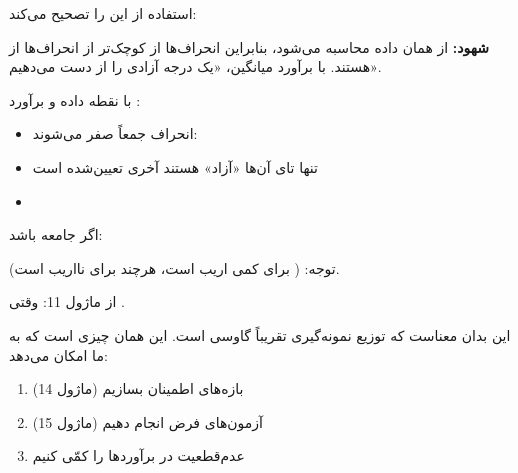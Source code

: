 استفاده از  این را تصحیح می‌کند:

\textbf{شهود:}  از همان داده محاسبه می‌شود، بنابراین انحراف‌ها از  کوچک‌تر از انحراف‌ها از \lr{$\mu$} هستند. با برآورد میانگین، «یک درجه آزادی را از دست می‌دهیم».


با  نقطه داده و برآورد :

\begin{itemize}
\tightlist
\item
   انحراف  جمعاً صفر می‌شوند: 
\item
  تنها  تای آن‌ها «آزاد» هستند  آخری تعیین‌شده است
\item
\end{itemize}


اگر جامعه  باشد:



توجه:  ( برای \lr{$\sigma$} کمی اریب است، هرچند  برای  نااریب است).


از ماژول 11:  وقتی .

این بدان معناست که توزیع نمونه‌گیری  تقریباً گاوسی است. این همان چیزی است که به ما امکان می‌دهد:

\begin{enumerate}
\def\labelenumi{\arabic{enumi}.}
\tightlist
\item
  بازه‌های اطمینان بسازیم (ماژول 14)
\item
  آزمون‌های فرض انجام دهیم (ماژول 15)
\item
  عدم‌قطعیت در برآوردها را کمّی کنیم
\end{enumerate}


